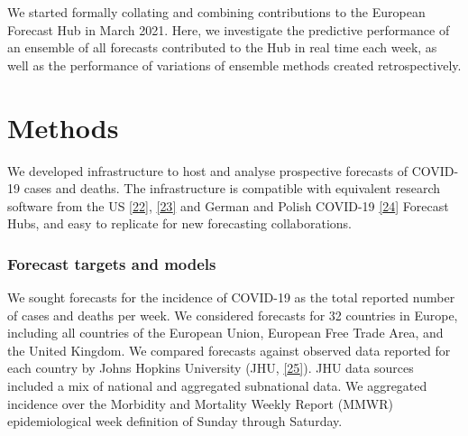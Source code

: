 \documentclass[
]{article}
\providecommand{\DIFaddbegin}{} %
\providecommand{\DIFaddend}{} %
\providecommand{\DIFdelbegin}{} %
\providecommand{\DIFdelend}{} %
\newcommand{\DIFscaledelfig}{0.5}
\newlength{\DIFdelgraphicswidth} %
\newlength{\DIFdelgraphicsheight} %
\newcommand{\DIFaddincludegraphics}[2][]{{\color{blue}\fbox{\DIFOincludegraphics[#1]{#2}}}} %
\newcommand{\DIFdelincludegraphics}[2][]{%
\sbox{\DIFdelgraphicsbox}{\DIFOincludegraphics[#1]{#2}}%
\settoboxwidth{\DIFdelgraphicswidth}{\DIFdelgraphicsbox} %
\settoboxtotalheight{\DIFdelgraphicsheight}{\DIFdelgraphicsbox} %
\scalebox{\DIFscaledelfig}{%
\parbox[b]{\DIFdelgraphicswidth}{\usebox{\DIFdelgraphicsbox}\\[-\baselineskip] \rule{\DIFdelgraphicswidth}{0em}}\llap{\resizebox{\DIFdelgraphicswidth}{\DIFdelgraphicsheight}{%
\setlength{\unitlength}{\DIFdelgraphicswidth}%
\begin{picture}(1,1)%
\thicklines\linethickness{2pt} %
{\color[rgb]{1,0,0}\put(0,0){\framebox(1,1){}}}%
{\color[rgb]{1,0,0}\put(0,0){\line( 1,1){1}}}%
{\color[rgb]{1,0,0}\put(0,1){\line(1,-1){1}}}%
\end{picture}%
}\hspace*{3pt}}} %
} %
\DeclareRobustCommand{\DIFaddbegin}{\DIFOaddbegin \let\includegraphics\DIFaddincludegraphics} %
\DeclareRobustCommand{\DIFaddend}{\DIFOaddend \let\includegraphics\DIFOincludegraphics} %
\DeclareRobustCommand{\DIFdelbegin}{\DIFOdelbegin \let\includegraphics\DIFdelincludegraphics} %
\DeclareRobustCommand{\DIFdelend}{\DIFOaddend \let\includegraphics\DIFOincludegraphics} %
\begin{document}
We started formally collating and combining contributions to the European Forecast Hub in March 2021. Here, we investigate the predictive performance of an ensemble of all forecasts contributed to the Hub in real time each week, as well as the performance of variations of ensemble methods created retrospectively.

\hypertarget{methods}{%
\section{Methods}\label{methods}}

We developed infrastructure to host and analyse prospective forecasts of COVID-19 cases and deaths. The infrastructure is compatible with equivalent research software from the US \protect\DIFdelbegin %
\DIFdelend \DIFaddbegin \hyperlink{ref-cramerReichlabCovid19forecasthubRelease2021}{{[}22{]}}\DIFaddend , \protect\DIFdelbegin %
\DIFdelend \DIFaddbegin \hyperlink{ref-wangReichlabCovidHubUtilsRepository2021}{{[}23{]}} \DIFaddend and German and Polish COVID-19 \protect\DIFdelbegin %
\DIFdelend \DIFaddbegin \hyperlink{ref-bracherGermanPolishCOVID192020}{{[}24{]}} \DIFaddend Forecast Hubs, and easy to replicate for new forecasting collaborations.

\hypertarget{forecast-targets-and-models}{%
\subsubsection{Forecast targets and models}\label{forecast-targets-and-models}}

We sought forecasts for the incidence of COVID-19 as the total reported number of cases and deaths per week. We considered forecasts for 32 countries in Europe, including all countries of the European Union, European Free Trade Area, and the United Kingdom. We compared forecasts against observed data reported for each country by Johns Hopkins University (JHU, \protect\DIFdelbegin %
\DIFdelend \DIFaddbegin \hyperlink{ref-dongInteractiveWebbasedDashboard2020}{{[}25{]}}\DIFaddend ). JHU data sources included a mix of national and aggregated subnational data. We aggregated incidence over the Morbidity and Mortality Weekly Report (MMWR) epidemiological week definition of Sunday through Saturday.
\end{document}
